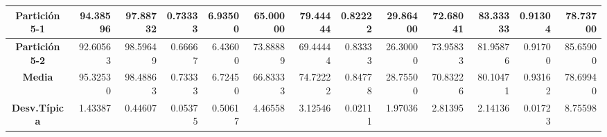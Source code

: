 \documentclass[a4paper,11pt]{article}
\begin{document}
\begin{table}[H]
\begin{adjustbox}{width=1.1\textwidth}
\begin{tabular}{|c|r|r|r|r|r|r|r|r|r|r|r|r|}
  \textbf{Partición 5-1} & 94.38596 & 97.88732 & 0.73333 & 6.93500 & 65.00000 & 79.44444 & 0.82222 & 29.86400 & 72.68041 & 83.33333 & 0.91304 & 78.73700 \\ \hline
  \textbf{Partición 5-2} & 92.60563 & 98.59649 & 0.66667 & 6.43600 & 73.88889 & 69.44444 & 0.83333 & 26.30000 & 73.95833 & 81.95876 & 0.91700 & 85.65900 \\ \hline
  \textbf{Media} & 95.32530 & 98.48863 & 0.73333 & 6.72450 & 66.83333 & 74.72222 & 0.84778 & 28.75500 & 70.83226 & 80.10471 & 0.93162 & 78.69940 \\ \hline
  \textbf{Desv.Típica} & 1.43387 & 0.44607 & 0.05375 & 0.50617 & 4.46558 & 3.12546 & 0.02111 & 1.97036 & 2.81395 & 2.14136 & 0.01723 & 8.75598 \\ \hline
  \end{tabular}
  \end{adjustbox}
  \label{GRASP}
  \end{table}
\end{document}
